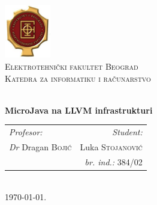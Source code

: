 \begin{titlepage}

\begin{center}


\includegraphics[width=0.15\textwidth]{etf_logo.jpg}\\[1cm]    

\textsc{\LARGE Elektrotehnički fakultet Beograd}\\[0.3cm]

\textsc{\Large Katedra za informatiku i računarstvo}\\[1.5cm]


\HRule \\[0.6cm]

\begin{doublespace}
{\huge \bfseries MicroJava na LLVM infrastrukturi}\\[0.3cm]
\end{doublespace}
\HRule

\vfill

\setlength{\tabcolsep}{1cm}
\resizebox{0.98\textwidth}{!} {
\begin{tabular}{lr}
        \emph{Profesor:} 		& \emph{Student:} \\
        \emph{Dr} Dragan \textsc{Bojić} & Luka \textsc{Stojanović} \\
        \emph{ } 			& \emph{br. ind.:} 384/02
\end{tabular}
}
\\[1cm]

{\large \today}.

\end{center}

\end{titlepage} 
